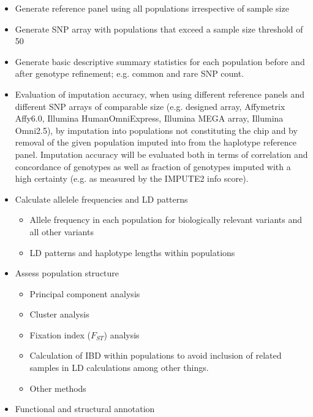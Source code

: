 \begin{itemize}
 \item Generate reference panel using all populations irrespective of sample size
 \item Generate SNP array with populations that exceed a sample size threshold of 50
 \item Generate basic descriptive summary statistics for each population before and after genotype refinement; e.g. common and rare SNP count.
 \item Evaluation of imputation accuracy, when using different reference panels and different SNP arrays of comparable size (e.g. designed array, Affymetrix Affy6.0, Illumina HumanOmniExpress, Illumina MEGA array, Illumina Omni2.5), by imputation into populations not constituting the chip and by removal of the given population imputed into from the haplotype reference panel. Imputation accuracy will be evaluated both in terms of correlation and concordance of genotypes as well as fraction of genotypes imputed with a high certainty (e.g. as measured by the IMPUTE2 info score).
 \item Calculate allelele frequencies and LD patterns
 \begin{itemize}
  \item Allele frequency in each population for biologically relevant variants and all other variants
  \item LD patterns and haplotype lengths within populations
 \end{itemize}
 \item Assess population structure
 \begin{itemize}
  \item Principal component analysis
  \item Cluster analysis
  \item {Fixation index ($F_{ST}$) analysis
  }
  \item Calculation of IBD within populations to avoid inclusion of related samples in LD calculations among other things.
  \item Other methods
 \end{itemize}
 \item Functional and structural annotation

\end{itemize}
